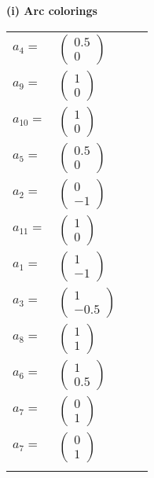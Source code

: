 \documentclass[1p]{elsarticle_modified}
\theoremstyle{definition}
\begin{document}
\flushleft \textbf{(i) Arc colorings}\\
\begin{tabular}{m{7pt} m{180pt} m{7pt} m{180pt} }
\flushright $a_{4}=$&$\begin{pmatrix}0.5\\0\end{pmatrix}$ \\
\flushright $a_{9}=$&$\begin{pmatrix}1\\0\end{pmatrix}$ \\
\flushright $a_{10}=$&$\begin{pmatrix}1\\0\end{pmatrix}$ \\
\flushright $a_{5}=$&$\begin{pmatrix}0.5\\0\end{pmatrix}$ \\
\flushright $a_{2}=$&$\begin{pmatrix}0\\-1\end{pmatrix}$ \\
\flushright $a_{11}=$&$\begin{pmatrix}1\\0\end{pmatrix}$ \\
\flushright $a_{1}=$&$\begin{pmatrix}1\\-1\end{pmatrix}$ \\
\flushright $a_{3}=$&$\begin{pmatrix}1\\-0.5\end{pmatrix}$ \\
\flushright $a_{8}=$&$\begin{pmatrix}1\\1\end{pmatrix}$ \\
\flushright $a_{6}=$&$\begin{pmatrix}1\\0.5\end{pmatrix}$ \\
\flushright $a_{7}=$&$\begin{pmatrix}0\\1\end{pmatrix}$\\ \flushright $a_{7}=$&$\begin{pmatrix}0\\1\end{pmatrix}$\\&\end{tabular}
\end{document}
